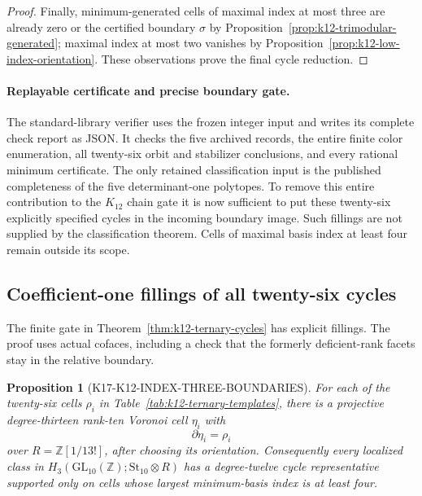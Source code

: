 \documentclass[11pt,a4paper]{article}
\newtheorem{proposition}[theorem]{Proposition}
\theoremstyle{definition}
\begin{document}
\begin{proof}
Finally, minimum-generated cells of maximal index at most three
are already zero or the certified boundary $\sigma$ by
Proposition~\ref{prop:k12-trimodular-generated}; maximal index at most
two vanishes by Proposition~\ref{prop:k12-low-index-orientation}.
These observations prove the final cycle reduction.
\end{proof}

\paragraph{Replayable certificate and precise boundary gate.}
The standard-library verifier
 uses the frozen integer
input  and writes its
complete check report as JSON. It checks the five archived records,
the entire finite color enumeration, all twenty-six orbit and
stabilizer conclusions, and every rational minimum certificate.
The only retained classification input is the published completeness
of the five determinant-one polytopes.
To remove this entire contribution to the $K_{12}$ chain gate it is
now sufficient to put these twenty-six explicitly specified cycles
in the incoming boundary image. Such fillings are not supplied by
the classification theorem. Cells of maximal basis index at least
four remain outside its scope.

\subsection{Coefficient-one fillings of all twenty-six cycles}
\label{subsec:k12-ternary-fillings}

The finite gate in Theorem~\ref{thm:k12-ternary-cycles} has explicit
fillings. The proof uses actual cofaces, including a check that the
formerly deficient-rank facets stay in the relative boundary.

\begin{proposition}[K17-K12-INDEX-THREE-BOUNDARIES]
\label{prop:k12-index-three-boundaries}
For each of the twenty-six cells $\rho_i$ in
Table~\ref{tab:k12-ternary-templates}, there is a projective
degree-thirteen rank-ten Voronoi cell $\eta_i$ with
\[
                       \partial\eta_i=\rho_i
\]
over $R=\mathbb Z[1/13!]$, after choosing its orientation.
Consequently every localized class in
$H_3(\mathrm{GL}_{10}(\mathbb Z);\mathrm{St}_{10}\otimes R)$
has a degree-twelve cycle representative supported only on cells
whose largest minimum-basis index is at least four.
\end{proposition}
\end{document}
